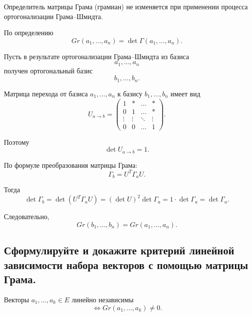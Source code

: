 \begin{theorem}
    Определитель матрицы Грама (грамиан) не изменяется при применении процесса ортогонализации Грама--Шмидта.
\end{theorem}

\begin{Proof}
    По определению
    \[
        Gr(a_1,\ldots,a_n)
        =
        \det \Gamma(a_1,\ldots,a_n).
    \]
    
    Пусть в результате ортогонализации Грама--Шмидта из базиса
    \[
        a_1,\ldots,a_n
    \]
    получен ортогональный базис
    \[
        b_1,\ldots,b_n.
    \]
    
    Матрица перехода от базиса $a_1,\ldots,a_n$ к базису $b_1,\ldots,b_n$ имеет вид
    \[
        U_{a\to b}
        =
        \begin{pmatrix}
            1 & * & \ldots & * \\
            0 & 1 & \ldots & * \\
            \vdots & \vdots & \ddots & \vdots \\
            0 & 0 & \ldots & 1
        \end{pmatrix}.
    \]
    
    Поэтому
    \[
        \det U_{a\to b}=1.
    \]
    
    По формуле преобразования матрицы Грама:
    \[
        \Gamma_b = U^T\Gamma_a U.
    \]
    
    Тогда
    \[
        \det \Gamma_b
        =
        \det(U^T\Gamma_a U)
        =
        (\det U)^2\det\Gamma_a
        =
        1\cdot \det\Gamma_a
        =
        \det\Gamma_a.
    \]
    
    Следовательно,
    \[
        Gr(b_1,\ldots,b_n)
        =
        Gr(a_1,\ldots,a_n).
    \]
\end{Proof}
\subsection{Сформулируйте и докажите критерий линейной зависимости набора векторов с помощью матрицы Грама.}

\begin{theorem}
    Векторы $a_1,\ldots,a_k \in E$ линейно независимы
    \[
        \Longleftrightarrow
        Gr(a_1,\ldots,a_k) \neq 0.
    \]
\end{theorem}

